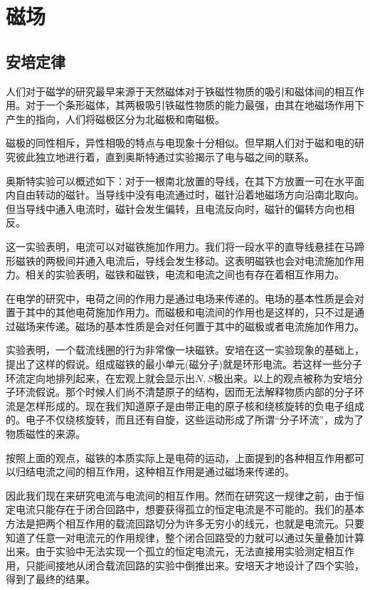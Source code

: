 \documentclass[12pt,a4paper,oneside]{report}
\theoremstyle{definition}
\theoremstyle{remark}
\begin{document}
\chapter{磁场}
\section{安培定律}

人们对于磁学的研究最早来源于天然磁体对于铁磁性物质的吸引和磁体间的相互作用。对于一个条形磁体，其两极吸引铁磁性物质的能力最强，由其在地磁场作用下产生的指向，人们将磁极区分为北磁极和南磁极。

磁极的同性相斥，异性相吸的特点与电现象十分相似。但早期人们对于磁和电的研究彼此独立地进行着，直到奥斯特通过实验揭示了电与磁之间的联系。

奥斯特实验可以概述如下：对于一根南北放置的导线，在其下方放置一可在水平面内自由转动的磁针。当导线中没有电流通过时，磁针沿着地磁场方向沿南北取向。但当导线中通入电流时，磁针会发生偏转，且电流反向时，磁针的偏转方向也相反。

这一实验表明，电流可以对磁铁施加作用力。我们将一段水平的直导线悬挂在马蹄形磁铁的两极间并通入电流后，导线会发生移动。这表明磁铁也会对电流施加作用力。相关的实验表明，磁铁和磁铁，电流和电流之间也有存在着相互作用力。

在电学的研究中，电荷之间的作用力是通过电场来传递的。电场的基本性质是会对置于其中的其他电荷施加作用力。而磁极和电流间的作用也是这样的，只不过是通过磁场来传递。磁场的基本性质是会对任何置于其中的磁极或者电流施加作用力。

实验表明，一个载流线圈的行为非常像一块磁铁。安培在这一实验现象的基础上，提出了这样的假说。组成磁铁的最小单元(磁分子)就是环形电流。若这样一些分子环流定向地排列起来，在宏观上就会显示出$N,S$极出来。以上的观点被称为安培分子环流假说。那个时候人们尚不清楚原子的结构，因而无法解释物质内部的分子环流是怎样形成的。现在我们知道原子是由带正电的原子核和绕核旋转的负电子组成的。电子不仅绕核旋转，而且还有自旋，这些运动形成了所谓“分子环流”，成为了物质磁性的来源。

按照上面的观点，磁铁的本质实际上是电荷的运动，上面提到的各种相互作用都可以归结电流之间的相互作用，这种相互作用是通过磁场来传递的。

因此我们现在来研究电流与电流间的相互作用。然而在研究这一规律之前，由于恒定电流只能存在于闭合回路中，想要获得孤立的恒定电流是不可能的。我们的基本方法是把两个相互作用的载流回路切分为许多无穷小的线元，也就是电流元。只要知道了任意一对电流元的作用规律，整个闭合回路受的力就可以通过矢量叠加计算出来。由于实验中无法实现一个孤立的恒定电流元，无法直接用实验测定相互作用，只能间接地从闭合载流回路的实验中倒推出来。安培天才地设计了四个实验，得到了最终的结果。
\end{document}
